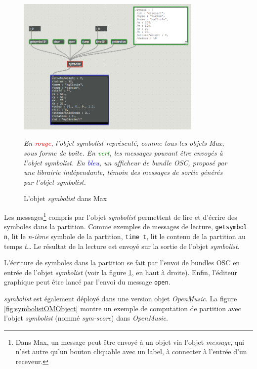 \begin{figure}[H]
	\centering
	\includegraphics[keepaspectratio=true, width=0.8\textwidth]{SymbolistOutilDeRecherche/i/symbolistMaxObject.png}
	\caption{L'objet \textit{symbolist} dans Max}
	\label{fig:symbolistMaxObject}
	\small
	\it
	En \textcolor{red}{rouge}, l'objet \emph{symbolist} représenté, comme tous les objets \emph{Max}, sous forme de boîte. En \textcolor{green}{vert}, les messages pouvant être envoyés à l'objet \emph{symbolist}.
	En \textcolor{blue}{bleu}, un afficheur de bundle OSC, proposé par une librairie indépendante, témoin des messages de sortie générés par l'objet \emph{symbolist}.  
\end{figure}

Les messages\footnote{Dans Max, un message peut être envoyé à un objet via l'objet \textit{message}, qui n'est autre qu'un bouton cliquable avec un label, à connecter à l'entrée d'un receveur.} compris par l'objet \textit{symbolist} permettent de lire et d'écrire des symboles dans la partition.
Comme exemples de messages de lecture, \lstinline|getsymbol n|, lit le \textit{n-ième} symbole de la partition, \lstinline|time t|, lit le contenu de la partition au temps \textit{t}…
Le résultat de la lecture est envoyé sur la sortie de l'objet \textit{symbolist}.

L'écriture de symboles dans la partition se fait par l'envoi de bundles OSC en entrée de l'objet \textit{symbolist} (voir la figure \ref{fig:symbolistMaxObject}, en haut à droite). 
Enfin, l'éditeur graphique peut être lancé par l'envoi du message \lstinline|open|.

\textit{symbolist} est également déployé dans une version objet \textit{OpenMusic}. La figure \ref{fig:symbolistOMObject} montre un exemple de computation de partition avec l'objet \textit{symbolist} (nommé \textit{sym-score}) dans \textit{OpenMusic}.

